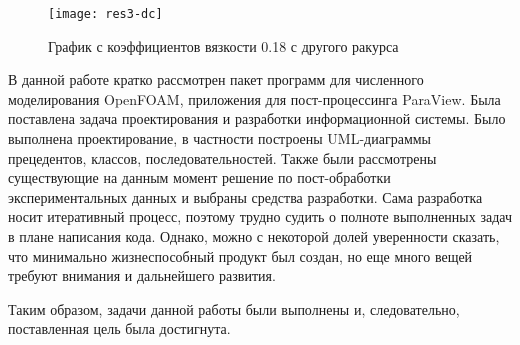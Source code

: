\documentclass[14pt]{extreport}
\begin{document}
\begin{figure}[H]
	\centerline{\texttt{[image: res3-dc]}}
	\caption{График с коэффициентов вязкости 0.18 с другого ракурса}
	\label{fig19}
\end{figure}


\conclusions

В данной работе кратко рассмотрен пакет программ для численного моделирования OpenFOAM, приложения для пост-процессинга ParaView. Была поставлена задача проектирования и разработки информационной системы. Было выполнена проектирование, в частности построены UML-диаграммы прецедентов, классов, последовательностей. Также были рассмотрены существующие на данным момент решение по пост-обработки экспериментальных данных и выбраны средства разработки. 
Сама разработка носит итеративный процесс, поэтому трудно судить о полноте выполненных задач в плане написания кода. Однако, можно с некоторой долей уверенности сказать, что минимально жизнеспособный продукт был создан, но еще много вещей требуют внимания и дальнейшего развития.

Таким образом, задачи данной работы были выполнены и, следовательно, поставленная цель была достигнута. 


% 
\end{document}

